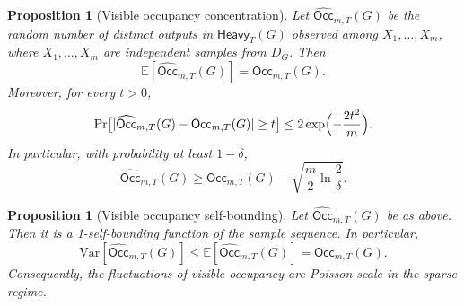 \documentclass[11pt]{article}
\newtheorem{proposition}[definition]{Proposition}
\theoremstyle{remark}
\theoremstyle{definition}
\begin{document}
\begin{proposition}[Visible occupancy concentration]
Let $\widehat{\mathsf{Occ}}_{m,T}(G)$ be the random number of distinct outputs in $\mathsf{Heavy}_T(G)$ observed among $X_1,\dots,X_m$, where $X_1,\dots,X_m$ are independent samples from $D_G$. Then
\[
\mathbb{E}[\widehat{\mathsf{Occ}}_{m,T}(G)] = \mathsf{Occ}_{m,T}(G).
\]
Moreover, for every $t > 0$,
\[
\Pr\bigl[|\widehat{\mathsf{Occ}}_{m,T}(G) - \mathsf{Occ}_{m,T}(G)| \ge t\bigr] \le 2\exp\Bigl(-\frac{2t^2}{m}\Bigr).
\]
In particular, with probability at least $1-\delta$,
\[
\widehat{\mathsf{Occ}}_{m,T}(G) \ge \mathsf{Occ}_{m,T}(G) - \sqrt{\frac{m}{2}\ln\frac{2}{\delta}}.
\]
\end{proposition}

\begin{proposition}[Visible occupancy self-bounding]
Let $\widehat{\mathsf{Occ}}_{m,T}(G)$ be as above. Then it is a 1-self-bounding function of the sample sequence. In particular,
\[
\mathrm{Var}[\widehat{\mathsf{Occ}}_{m,T}(G)] \le \mathbb{E}[\widehat{\mathsf{Occ}}_{m,T}(G)] = \mathsf{Occ}_{m,T}(G).
\]
Consequently, the fluctuations of visible occupancy are Poisson-scale in the sparse regime.
\end{proposition}



\end{document}
